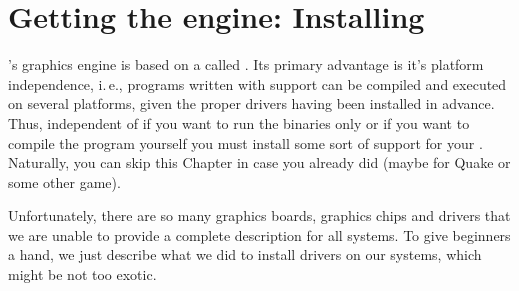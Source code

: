 
\chapter{Getting the engine: Installing  \label{opengl}}

\FlightGear's graphics engine is based on a  called
. Its primary advantage is it's platform independence, i.\,e., programs
written with  support can be compiled and executed on several platforms,
given the proper drivers having been installed in advance. Thus, independent of if you
want to run the binaries only or if you want to compile the program yourself you must
install some sort of  support for your . Naturally, you
can skip this Chapter in case you already did (maybe for Quake or some other game).

Unfortunately, there are so many graphics boards, graphics chips and drivers that we are
unable to provide a complete description for all systems. To give beginners a hand, we
just describe what we did to install drivers on our systems, which might be not too
exotic.


